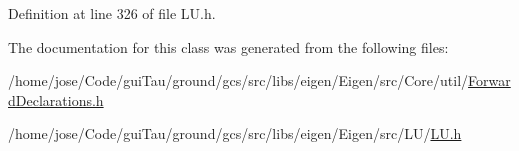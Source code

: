 Definition at line 326 of file L\-U.\-h.



The documentation for this class was generated from the following files\-:\begin{DoxyCompactItemize}
\item 
/home/jose/\-Code/gui\-Tau/ground/gcs/src/libs/eigen/\-Eigen/src/\-Core/util/\hyperlink{_forward_declarations_8h}{Forward\-Declarations.\-h}\item 
/home/jose/\-Code/gui\-Tau/ground/gcs/src/libs/eigen/\-Eigen/src/\-L\-U/\hyperlink{_l_u_8h}{L\-U.\-h}\end{DoxyCompactItemize}
